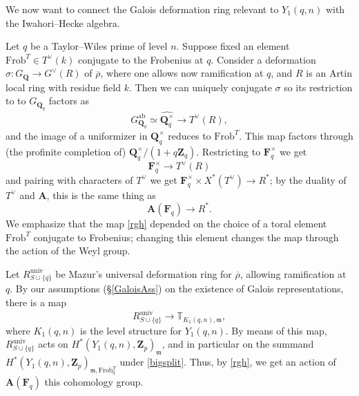 \documentclass[10pt]{amsart}
\newcommand{\Z}{\mathbf{Z}}
\newcommand{\univ}{\mathrm{univ}}
\newcommand{\Frobl}{\mathrm{Frob}^T}
\newcommand{\ab}{\mathrm{ab}}
\newcommand{\rhobar}{\overline{\rho}}
\newcommand{\Frob}{\mathrm{Frob}}
\newcommand{\Q}{\mathbf{Q}}
\newcommand{\ramprimes}{S}
\theoremstyle{remark}
\begin{document}
   \medskip
   
   We now want to connect the Galois deformation ring relevant to $Y_1(q,n)$ with the Iwahori--Hecke algebra. 
   
   
   
   

 Let $q$ be a Taylor--Wiles prime of level $n$. 
   Suppose fixed an element $\Frobl \in T^{\vee}(k)$ conjugate to the Frobenius at $q$. 
Consider a deformation   $\sigma: G_{\Q} \rightarrow G^{\vee}(R)$
    of $\rhobar$, where one allows now ramification at $q$,
    and $R$ is an Artin local ring with residue field $k$. 
     Then we can  uniquely conjugate
   $\sigma$ so its restriction to     to $G_{\Q_{q}}$ factors as 
$$ G_{\Q_{q}}^{\ab} \simeq  \widehat{\Q_{q}^{\times}} \longrightarrow T^{\vee}(R),$$
and the image of a uniformizer in $\Q_q^{\times}$ reduces to $\Frobl$.  This map  factors through (the profinite completion of) 
$\Q_q^{\times}/(1+q \Z_q)$. Restricting to $\mathbf{F}_{q}^{\times}$ we get
$$\mathbf{F}_{q}^{\times} \rightarrow T^{\vee}(R)$$
and pairing with characters of $T^{\vee}$ we get
$ \mathbf{F}_{q}^{\times} \times X^*(T^{\vee}) \rightarrow R^*$;
by the duality of $T^{\vee}$ and $\mathbf{A}$, this is the same thing as
\begin{equation} \label{rgh}  \mathbf{A}(\mathbf{F}_{q}) \rightarrow R^*. \end{equation}
We emphasize that the map \eqref{rgh} depended on the choice of a toral element $\Frobl$ conjugate to Frobenius; changing this element
changes the map through the action of the Weyl group. 

 Let $R^{\univ}_{\ramprimes \cup \{q\}}$ be Mazur's universal deformation ring for $\rhobar$, allowing ramification at $q$.  
By our assumptions  (\S \ref{GaloisAss}) on the existence of Galois representations, there is a map $$R^{\univ}_{\ramprimes \cup \{q\}} \rightarrow \mathbb{T}_{K_1(q,n), \mathfrak{m}},$$
where $K_1(q,n)$ is the level structure for $Y_1(q,n)$.
By means of this map, $R^{\univ}_{\ramprimes \cup \{q\}}$ acts on $H^*(Y_1(q,n), \Z_p)_{\mathfrak{m}}$,
and in particular on the summand $H^*(Y_1(q,n), \Z_p)_{\mathfrak{m}, \Frob_q^T}$ under \eqref{bigsplit}. 
Thus, by \eqref{rgh}, we get an action of $\mathbf{A}(\mathbf{F}_{q})$ this cohomology group. 
\end{document}
